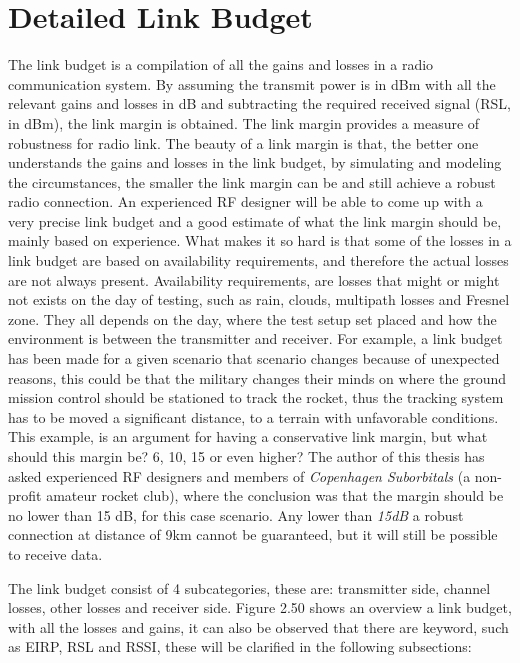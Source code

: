 \newpage

\section{Detailed Link Budget}
The link budget is a compilation of all the gains and losses in a radio communication system. By assuming the transmit power is in dBm with all the relevant gains and losses in dB and subtracting the required received signal (RSL, in dBm), the link margin is obtained. The link margin provides a measure of robustness for radio link. The beauty of a link margin is that, the better one understands the gains and losses in the link budget, by simulating and modeling the circumstances, the smaller the link margin can be and still achieve a robust radio connection. An experienced RF designer will be able to come up with a very precise link budget and a good estimate of what the link margin should be, mainly based on experience. What makes it so hard is that some of the losses in a link budget are based on availability requirements, and therefore the actual losses are not always present. Availability requirements, are losses that might or might not exists on the day of testing, such as rain, clouds, multipath losses and Fresnel zone. They all depends on the day, where the test setup set placed and how the environment is between the transmitter and receiver. For example, a link budget has been made for a given scenario that scenario changes because of unexpected reasons, this could be that the military changes their minds on where the ground mission control should be stationed to track the rocket, thus the tracking system has to be moved a significant distance, to a terrain with unfavorable conditions. This example, is an argument for having a conservative link margin, but what should this margin be? 6, 10, 15 or even higher? The author of this thesis has asked experienced RF designers and members of \textit{Copenhagen Suborbitals}\cite{CopenhagenSuborbitals} (a non-profit amateur rocket club), where the conclusion was that the margin should be no lower than 15 dB, for this case scenario. Any lower than \textit{15dB} a robust connection at distance of 9km cannot be guaranteed, but it will still be possible to receive data.

The link budget consist of 4 subcategories, these are: transmitter side, channel losses, other losses and receiver side. Figure 2.50 shows an overview a link budget, with all the losses and gains, it can also be observed that there are keyword, such as EIRP, RSL and RSSI, these will be clarified in the following subsections: 

